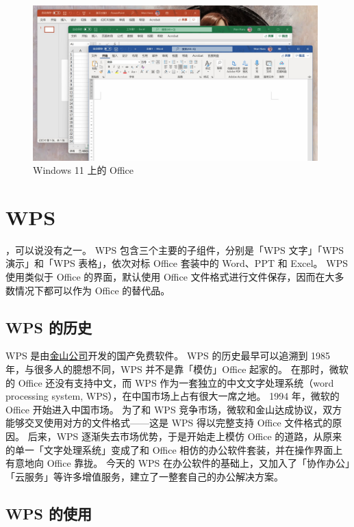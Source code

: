 \begin{figure}[htb!]
  \centering
  \includegraphics[width=11cm]{assets/Office_on_Win_11.jpg}
  \caption{Windows 11 上的 Office}
  \label{Office_on_Win_11}
\end{figure}

\section{WPS}

，可以说没有之一。
WPS 包含三个主要的子组件，分别是「WPS 文字」「WPS 演示」和「WPS 表格」，依次对标 Office 套装中的 Word、PPT 和 Excel。
WPS 使用类似于 Office 的界面，默认使用 Office 文件格式进行文件保存，因而在大多数情况下都可以作为 Office 的替代品。

\subsection{WPS 的历史}

WPS 是由\href{https://www.kingsoft.com/}{金山公司}开发的国产免费软件。
WPS 的历史最早可以追溯到 1985 年，与很多人的臆想不同，WPS 并不是靠「模仿」Office 起家的。
在那时，微软的 Office 还没有支持中文，而 WPS 作为一套独立的中文文字处理系统（word processing system, WPS），在中国市场上占有很大一席之地。
1994 年，微软的 Office 开始进入中国市场。
为了和 WPS 竞争市场，微软和金山达成协议，双方能够交叉使用对方的文件格式——这是 WPS 得以完整支持 Office 文件格式的原因。
后来，WPS 逐渐失去市场优势，于是开始走上模仿 Office 的道路，从原来的单一「文字处理系统」变成了和 Office 相仿的办公软件套装，并在操作界面上有意地向 Office 靠拢。
今天的 WPS 在办公软件的基础上，又加入了「协作办公」「云服务」等许多增值服务，建立了一整套自己的办公解决方案。

\subsection{WPS 的使用}

